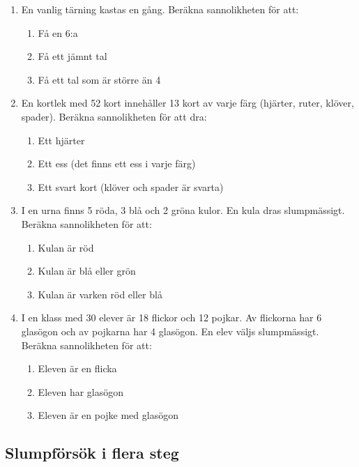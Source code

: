 \documentclass[a4paper,11pt]{article}
\begin{document}
\begin{enumerate}[label=\textbf{\arabic*.}]
    \item En vanlig tärning kastas en gång. Beräkna sannolikheten för att:
    \begin{enumerate}[label=\alph*)]
        \item Få en 6:a
        \item Få ett jämnt tal
        \item Få ett tal som är större än 4
    \end{enumerate}
    
    \item En kortlek med 52 kort innehåller 13 kort av varje färg (hjärter, ruter, klöver, spader). Beräkna sannolikheten för att dra:
    \begin{enumerate}[label=\alph*)]
        \item Ett hjärter
        \item Ett ess (det finns ett ess i varje färg)
        \item Ett svart kort (klöver och spader är svarta)
    \end{enumerate}
    
    \item I en urna finns 5 röda, 3 blå och 2 gröna kulor. En kula dras slumpmässigt. Beräkna sannolikheten för att:
    \begin{enumerate}[label=\alph*)]
        \item Kulan är röd
        \item Kulan är blå eller grön
        \item Kulan är varken röd eller blå
    \end{enumerate}
    
    \item I en klass med 30 elever är 18 flickor och 12 pojkar. Av flickorna har 6 glasögon och av pojkarna har 4 glasögon. En elev väljs slumpmässigt. Beräkna sannolikheten för att:
    \begin{enumerate}[label=\alph*)]
        \item Eleven är en flicka
        \item Eleven har glasögon
        \item Eleven är en pojke med glasögon
    \end{enumerate}
\end{enumerate}

\subsection*{Slumpförsök i flera steg}
\end{document}
